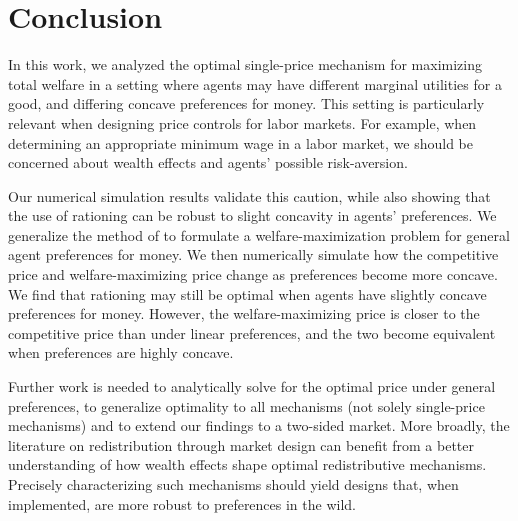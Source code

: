 \documentclass[AER]{AEA}
\begin{document}

\section{Conclusion}
\label{sec:conclusion}

In this work, we analyzed the optimal single-price mechanism for maximizing total welfare in a setting where agents may have different marginal utilities for a good, and differing concave preferences for money. This setting is particularly relevant when designing price controls for labor markets. For example, when determining an appropriate minimum wage in a labor market, we should be concerned about wealth effects and agents' possible risk-aversion.

Our numerical simulation results validate this caution, while also showing that the use of rationing can be robust to slight concavity in agents' preferences. We generalize the method of \cite{dworczak-2020} to formulate a welfare-maximization problem for general agent preferences for money. We then numerically simulate how the competitive price and welfare-maximizing price change as preferences become more concave. We find that rationing may still be optimal when agents have slightly concave preferences for money. However, the welfare-maximizing price is closer to the competitive price than under linear preferences, and the two become equivalent when preferences are highly concave.

Further work is needed to analytically solve for the optimal price under general preferences, to generalize optimality to all mechanisms (not solely single-price mechanisms) and to extend our findings to a two-sided market. More broadly, the literature on redistribution through market design can benefit from a better understanding of how wealth effects shape optimal redistributive mechanisms. Precisely characterizing such mechanisms should yield designs that, when implemented, are more robust to preferences in the wild.




\end{document}
